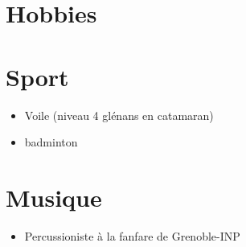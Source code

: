 \documentclass[custom]{hipstercv} %
\newlength{\rightcolwidth}
\begin{document}
\begin{paracol}{2}
\begin{tabular}{r| p{} c}
\end{tabular}

\vspace{4em}
\section*{Hobbies}
\begin{minipage}[t]{0.3\textwidth}
\section*{Sport}
\begin{itemize}
    \item Voile (niveau 4 glénans en catamaran)
    \item badminton
\end{itemize}
\end{minipage}
\begin{minipage}[t]{0.3\textwidth}
\section*{Musique}
\begin{itemize}
\item Percussioniste à la fanfare de Grenoble-INP
\end{itemize}
\end{minipage}





\end{paracol}
\end{document}

